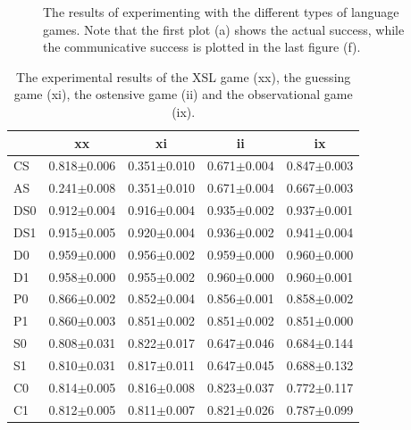 \begin{figure}[t]
\centering
{}
\caption{The results of experimenting with the different types of language games. Note that the first plot (a) shows the actual success, while the communicative success is plotted in the last figure (f).}
\label{f:par:feedback}
\end{figure}


\begin{table}
\centering
\begin{tabular}{||l|c|c|c|c||}
\hline\hline
&     {\bf xx}&        {\bf xi}&               {\bf ii}&         {\bf ix}       \\\hline
CS&   0.818$\pm$0.006& 0.351$\pm$0.010&        0.671$\pm$0.004&  0.847$\pm$0.003\\\hline
AS&   0.241$\pm$0.008& 0.351$\pm$0.010&        0.671$\pm$0.004&  0.667$\pm$0.003\\\hline
DS0&  0.912$\pm$0.004& 0.916$\pm$0.004&        0.935$\pm$0.002&  0.937$\pm$0.001\\\hline
DS1&  0.915$\pm$0.005& 0.920$\pm$0.004&        0.936$\pm$0.002&  0.941$\pm$0.004\\\hline
D0&   0.959$\pm$0.000& 0.956$\pm$0.002&        0.959$\pm$0.000&  0.960$\pm$0.000\\\hline
D1&   0.958$\pm$0.000& 0.955$\pm$0.002&        0.960$\pm$0.000&  0.960$\pm$0.001\\\hline
P0&   0.866$\pm$0.002& 0.852$\pm$0.004&        0.856$\pm$0.001&  0.858$\pm$0.002\\\hline
P1&   0.860$\pm$0.003& 0.851$\pm$0.002&        0.851$\pm$0.002&  0.851$\pm$0.000\\\hline
S0&   0.808$\pm$0.031& 0.822$\pm$0.017&        0.647$\pm$0.046&  0.684$\pm$0.144\\\hline
S1&   0.810$\pm$0.031& 0.817$\pm$0.011&        0.647$\pm$0.045&  0.688$\pm$0.132\\\hline
C0&   0.814$\pm$0.005& 0.816$\pm$0.008&        0.823$\pm$0.037&  0.772$\pm$0.117\\\hline
C1&   0.812$\pm$0.005& 0.811$\pm$0.007&        0.821$\pm$0.026&  0.787$\pm$0.099\\\hline
\hline
\end{tabular}
\caption{The experimental results of the XSL game (xx), the guessing game (xi), the ostensive game (ii) and the observational game (ix).}
\label{t:par:feedback}
\end{table}

